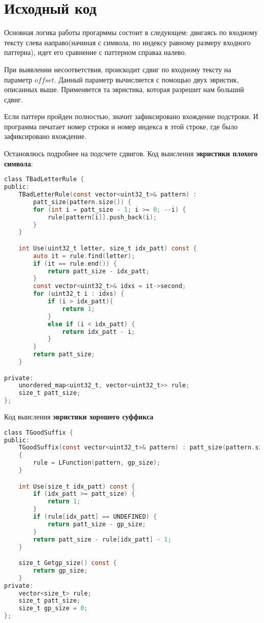 \pagebreak

\section{Исходный код}

Основная логика работы прогарммы состоит в следующем: двигаясь по входному тексту слева направо(начиная с символа, по индексу равному размеру входного паттерна), идет его сравнение с паттерном справаа налево.\newline 

При выявлении несоответствия, проискодит сдвиг по входному тексту на параметр $offset$.
Данный параметр вычисляется с помощью двух эвристик, описанных выше. Применяется та эвристика, которая разрешит нам больший сдвиг.\newline

Если паттерн пройден полностью, значит зафиксировано вхождение подстроки. И программа печатает номер строки и номер индекса в этой строке, где было зафиксировано вхождение.\newline

Остановлюсь подробнее на подсчете сдвигов.\newline
Код выисления \textbf{эвристики плохого символа}:\newline
\begin{lstlisting}[language=C]
class TBadLetterRule {
public:
	TBadLetterRule(const vector<uint32_t>& pattern) :
		patt_size(pattern.size()) {
		for (int i = patt_size - 1; i >= 0; --i) {
			rule[pattern[i]].push_back(i);
		}
	}

	int Use(uint32_t letter, size_t idx_patt) const {
		auto it = rule.find(letter);
		if (it == rule.end()) {
			return patt_size - idx_patt;
		}
		const vector<uint32_t>& idxs = it->second;
		for (uint32_t i : idxs) {
			if (i > idx_patt){
				return 1;
			}
			else if (i < idx_patt) {
				return idx_patt - i;
			}
		}
		return patt_size;
	}

private:
	unordered_map<uint32_t, vector<uint32_t>> rule;
	size_t patt_size;
};
\end{lstlisting}

Код выисления \textbf{эвристики хорошего суффикса}
\begin{lstlisting}[language=C]
class TGoodSuffix {
public:
	TGoodSuffix(const vector<uint32_t>& pattern) : patt_size(pattern.size())
	{
		rule = LFunction(pattern, gp_size);
	}

	int Use(size_t idx_patt) const {
		if (idx_patt >= patt_size) {
			return 1;
		}
		if (rule[idx_patt] == UNDEFINED) {
			return patt_size - gp_size;
		}
		return patt_size - rule[idx_patt] - 1;
	}

	size_t Getgp_size() const {
		return gp_size;
	}
private:
	vector<size_t> rule;
	size_t patt_size;
	size_t gp_size = 0;
};
\end{lstlisting}

